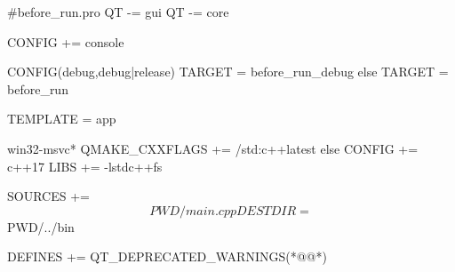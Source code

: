 \label{f000008}    %
\FloatBarrier                                  %
\begin{thebookfilesourceone}[escapeinside={(*@}{@*)},
caption=GoodLuck,
title=\filesourcenumbernameone \thefilesourcenumber
]
#before_run.pro
QT -= gui
QT -= core

CONFIG += console

CONFIG(debug,debug|release){
    TARGET = before_run_debug
}else{
    TARGET = before_run
}

TEMPLATE = app

win32-msvc*{
    QMAKE_CXXFLAGS += /std:c++latest
}else{
    CONFIG += c++17
    LIBS += -lstdc++fs
}

SOURCES += $$PWD/main.cpp
DESTDIR =  $$PWD/../bin

DEFINES += QT_DEPRECATED_WARNINGS(*@\marginpar[\hfill\setlength\fboxsep{2pt}\fbox{\footnotesize{\kaishu\parbox{1em}{\setlength{\baselineskip}{2pt}\filesourcenumbernameone}}\footnotesize{\thefilesourcenumber}}]{\setlength\fboxsep{2pt}\fbox{\footnotesize{\kaishu\parbox{1em}{\setlength{\baselineskip}{2pt}\filesourcenumbernameone}}\footnotesize{\thefilesourcenumber}}}@*)\end{thebookfilesourceone}          %
\addtocounter{lstlisting}{-1}   %
\label{f000009}    %
\FloatBarrier                                  %
